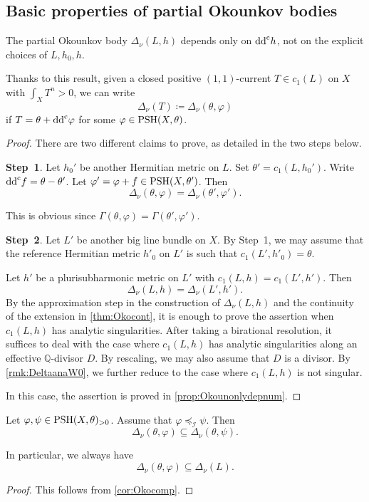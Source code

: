 \subsection{Basic properties of partial Okounkov bodies}
\label{subsec:pob_prop}

\begin{proposition}\label{prop:Okocurrent}
	The partial Okounkov body $\Delta_{\nu}(L,h)$ depends only on $\mathrm{dd}^{\mathrm{c}} h$, not on the explicit choices of $L,h_0,h$.
\end{proposition}
Thanks to this result, given a closed positive $(1,1)$-current $T\in c_1(L)$ on $X$ with $\int_X T^n>0$, we can write
\[
\Delta_{\nu}(T)\coloneqq \Delta_{\nu}(\theta,\varphi)
\]
if $T=\theta+\mathrm{dd}^{\mathrm{c}}\varphi$ for some $\varphi\in \mathrm{PSH}(X,\theta)$.
\begin{proof}
	There are two different claims to prove, as detailed in the two steps below.

\textbf{Step~1}. Let $h_0'$ be another Hermitian metric on $L$. Set $\theta'=c_1(L,h_0')$. Write $\mathrm{dd}^{\mathrm{c}} f=\theta-\theta'$.
	Let $\varphi'=\varphi+f\in \mathrm{PSH}(X,\theta')$. Then
	\begin{equation}\label{eq:DeltaDelta1}
		\Delta_{\nu}(\theta,\varphi)=\Delta_{\nu}(\theta',\varphi').
	\end{equation}

 This is obvious since $\Gamma(\theta,\varphi)=\Gamma(\theta',\varphi')$.

 \textbf{Step~2}. Let $L'$ be another big line bundle on $X$. By Step~1, we may assume that the reference Hermitian metric $h'_0$ on $L'$ is such that $c_1(L',h'_0)=\theta$.

 Let $h'$ be a plurisubharmonic metric on $L'$ with $c_1(L,h)=c_1(L',h')$. Then
 \[
 \Delta_{\nu}(L,h)=\Delta_{\nu}(L',h').
 \]
 By the approximation step in the construction of $\Delta_\nu(L,h)$ and the continuity of the extension in \cref{thm:Okocont}, it is enough to prove the assertion when $c_1(L,h)$ has analytic singularities. After taking a birational resolution, it suffices to deal with the case where $c_1(L,h)$ has analytic singularities along an effective $\mathbb{Q}$-divisor $D$. By rescaling, we may also assume that $D$ is a divisor. By \cref{rmk:DeltaanaW0}, we further reduce to the case where $c_1(L,h)$ is not singular.

In this case, the assertion is proved in \cref{prop:Okounonlydepnum}.
\end{proof}

\begin{proposition}\label{prop:IcompimplyDeltacomp}
	Let $\varphi,\psi\in \mathrm{PSH}(X,\theta)_{>0}$. Assume that $\varphi\preceq_{\mathcal{I}} \psi$. Then
	\begin{equation}\label{eq:Deltacomp}
		\Delta_{\nu}(\theta,\varphi)  \subseteq \Delta_{\nu}(\theta,\psi).
	\end{equation}
\end{proposition}
In particular, we always have
\[
\Delta_{\nu}(\theta,\varphi)\subseteq \Delta_{\nu}(L).
\]
\begin{proof}
	This follows from \cref{cor:Okocomp}.
\end{proof}




